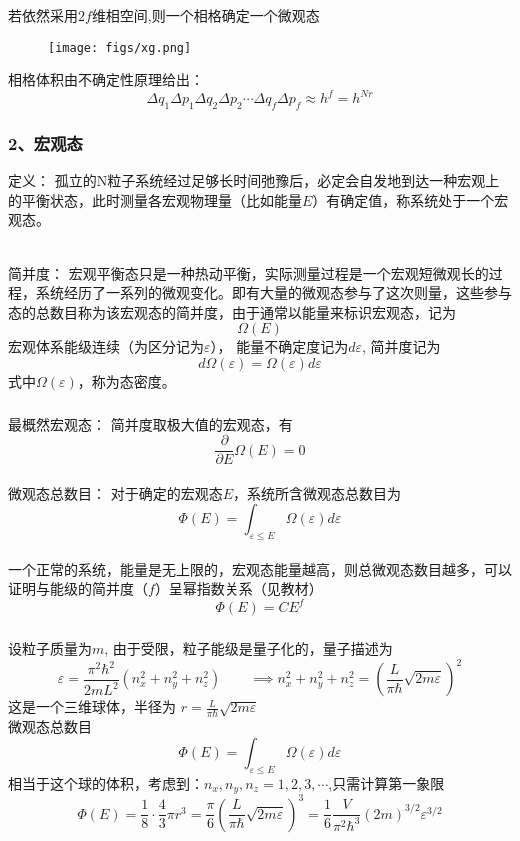 \begin{frame}
  \frametitle{}
  若依然采用$2f$维相空间,则一个相格确定一个微观态\\
  \begin{figure}[htbp]
    \centering
    \texttt{[image: figs/xg.png]}
  \end{figure}
  相格体积由不确定性原理给出：
  \[ \Delta q_1 \Delta p_1 \Delta q_2 \Delta p_2 \cdots \Delta q_f \Delta p_f \approx h^f = h^{Nr}\]
\end{frame} 

\begin{frame}
  \frametitle{ 2、宏观态}
  \alert{定义：} 孤立的N粒子系统经过足够长时间弛豫后，必定会自发地到达一种宏观上的平衡状态，此时测量各宏观物理量（比如能量$E$）有确定值，称系统处于一个宏观态。

  ~~\\ 
  \alert{简并度：} 宏观平衡态只是一种热动平衡，实际测量过程是一个宏观短微观长的过程，系统经历了一系列的微观变化。即有大量的微观态参与了这次则量，这些参与态的总数目称为该宏观态的简并度，由于通常以能量来标识宏观态，记为
  \[\Omega(E)\]
  宏观体系能级连续（为区分记为$\varepsilon$）， 能量不确定度记为$d \varepsilon$, 简并度记为 
  \[d\Omega(\varepsilon) = \Omega(\varepsilon) d \varepsilon \]
  式中$\Omega(\varepsilon)$，称为态密度。
\end{frame} 

\begin{frame}
  \frametitle{}
  \alert{最概然宏观态：} 简并度取极大值的宏观态，有
  \[\frac{\partial }{\partial E }\Omega(E) =0\]
  ~~\\ 
  \alert{微观态总数目：} 对于确定的宏观态$E$，系统所含微观态总数目为
  \[\Phi(E) = \int_{\varepsilon \le E} \Omega(\varepsilon) d \varepsilon\]
  ~~\\ 
  一个正常的系统，能量是无上限的，宏观态能量越高，则总微观态数目越多，可以证明与能级的简并度（$f$）呈幂指数关系（见教材）
  \[\Phi(E) =C E^f\]
\end{frame} 
 
\begin{frame}
  \frametitle{}
  \解 设粒子质量为$m$, 由于受限，粒子能级是量子化的，量子描述为
  \[ \varepsilon = \frac{\pi ^2 \hbar^2}{2m L^2}(n_x^2 +n_y^2 + n_z^2 )\qquad \implies n_x^2 +n_y^2 + n_z^2 = \left( \frac{L}{\pi \hbar} \sqrt{2m \varepsilon}  \right)^2 \]
  这是一个三维球体，半径为 $ r =  \frac{L}{\pi \hbar} \sqrt{2m \varepsilon} $  \\
  微观态总数目
  \[\Phi(E) = \int_{\varepsilon \le E} \Omega(\varepsilon) d \varepsilon\]
  相当于这个球的体积，考虑到：$n_x, n_y, n_z =1,2,3,\cdots$,只需计算第一象限
  \[\Phi(E) = \frac{1}{8} \cdot\frac{4}{3} \pi r^3 = \frac{\pi}{6} \left( \frac{L}{\pi \hbar} \sqrt{2m \varepsilon}  \right)^3 = \frac{1}{6} \frac{V}{\pi ^2 \hbar^3} (2m)^{3/2} \varepsilon^{3/2} \]
\end{frame} 

